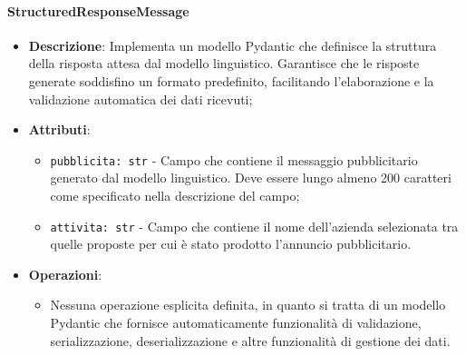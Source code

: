 \documentclass[10pt]{article}
\begin{document}
    \paragraph{StructuredResponseMessage}
    \begin{itemize} 
    \item \textbf{Descrizione}: Implementa un modello Pydantic che definisce la struttura della risposta attesa dal modello linguistico. Garantisce che le risposte generate soddisfino un formato predefinito, facilitando l'elaborazione e la validazione automatica dei dati ricevuti;
    \item \textbf{Attributi}:
    \begin{itemize}
        \item \texttt{pubblicita: str} - Campo che contiene il messaggio pubblicitario generato dal modello linguistico. Deve essere lungo almeno 200 caratteri come specificato nella descrizione del campo;
        \item \texttt{attivita: str} - Campo che contiene il nome dell'azienda selezionata tra quelle proposte per cui è stato prodotto l'annuncio pubblicitario.
    \end{itemize}
    
    \item \textbf{Operazioni}:
    \begin{itemize}
        \item Nessuna operazione esplicita definita, in quanto si tratta di un modello Pydantic che fornisce automaticamente funzionalità di validazione, serializzazione, deserializzazione e altre funzionalità di gestione dei dati.
    \end{itemize}
    \end{itemize}
\end{document}
